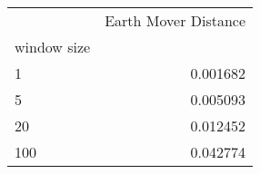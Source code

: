 \begin{tabular}{lr}
\toprule
{} &  Earth Mover Distance \\
window size &                       \\
\midrule
1           &              0.001682 \\
5           &              0.005093 \\
20          &              0.012452 \\
100         &              0.042774 \\
\bottomrule
\end{tabular}
